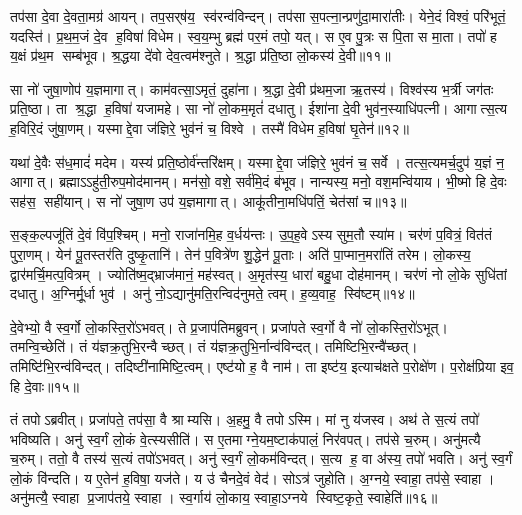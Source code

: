    तप॑सा दे॒वा दे॒वता॒मग्र॑ आयन्।
   तप॒सर्‌ष॑य॒ स्व॑रन्व॑विन्दन्।
   तप॑सा स॒पत्ना॒न्प्रणु॑दा॒मारा॑तीः।
   येने॒दं विश्वं॒ परि॑भूतं॒ यदस्ति॑।
   प्र॒थ॒म॒जं दे॒व ह॒विषा॑ विधेम।
   स्व॒य॒म्भु ब्रह्म॑ पर॒मं तपो॒ यत्।
   स ए॒व पु॒त्रः स पि॒ता स मा॒ता।
   तपो॑ ह य॒क्षं प्र॑थ॒म सम्ब॑भूव।
   श्र॒द्धया दे॑वो देव॒त्वम॑श्नुते।
   श्र॒द्धा प्र॑ति॒ष्ठा लो॒कस्य॑ दे॒वी॥११॥

   सा नो॑ जुषा॒णोप॑ य॒ज्ञमागात्।
   काम॑वत्सा॒ऽमृतं॒ दुहा॑ना।
   श्र॒द्धा दे॒वी प्र॑थम॒जा ऋ॒तस्य॑।
   विश्व॑स्य भ॒र्त्री जग॑तः प्रति॒ष्ठा।
   ता श्र॒द्धा ह॒विषा॑ यजामहे।
   सा नो॑ लो॒कम॒मृतं॑ दधातु।
   ईशा॑ना दे॒वी भुव॑न॒स्याधि॑पत्नी।
   आगात्स॒त्य ह॒विरि॒दं जु॑षा॒णम्।
   यस्माद्दे॒वा ज॑ज्ञिरे॒ भुव॑नं च॒ विश्वे।
   तस्मै॑ विधेम ह॒विषा॑ घृ॒तेन॑॥१२॥

   यथा॑ दे॒वैः स॑ध॒मादं॑ मदेम।
   यस्य॑ प्रति॒ष्ठोर्व॑न्तरि॑क्षम्।
   यस्माद्दे॒वा ज॑ज्ञिरे॒ भुव॑नं च॒ सर्वे।
   तत्स॒त्यमर्च॒दुप॑ य॒ज्ञं न॒ आगात्।
   ब्रह्माऽऽहु॑ती॒रुप॒मोद॑मानम्।
   मन॑सो॒ वशे॒ सर्व॑मि॒दं ब॑भूव।
   नान्यस्य॒ मनो॒ वश॒मन्वि॑याय।
   भी॒ष्मो हि दे॒वः सह॑स॒ सही॑यान्।
   स नो॑ जुषा॒ण उप॑ य॒ज्ञमागात्।
   आकू॑तीना॒मधि॑पतिं॒ चेत॑सां च॥१३॥

   स॒ङ्क॒ल्पजू॑तिं दे॒वं वि॑प॒श्चिम्।
   मनो॒ राजा॑नमि॒ह व॒र्धय॑न्तः।
   उ॒प॒ह॒वेऽस्य सुम॒तौ स्या॑म।
   चर॑णं प॒वित्रं॒ वित॑तं पुरा॒णम्।
   येन॑ पू॒तस्तर॑ति दुष्कृ॒तानि॑।
   तेन॑ प॒वित्रे॑ण शु॒द्धेन॑ पू॒ताः।
   अति॑ पा॒प्मान॒मरा॑तिं तरेम।
   लो॒कस्य॒ द्वार॑मर्चि॒मत्प॒वित्रम्।
   ज्योति॑ष्म॒द्भ्राज॑मानं॒ मह॑स्वत्।
   अ॒मृत॑स्य॒ धारा॑ बहु॒धा दोह॑मानम्।
   चर॑णं नो लो॒के सुधि॑तां दधातु।
   अ॒ग्निर्मू॒र्धा भुव॑।
   अनु॑ नो॒ऽद्यानु॑मति॒रन्विद॑नुमते॒ त्वम्।
   ह॒व्य॒वाह॒ स्वि॑ष्टम्॥१४॥
\anuvakamend
  
   दे॒वेभ्यो॒ वै स्व॒र्गो लो॒कस्ति॒रो॑ऽभवत्।
   ते प्र॒जाप॑तिमब्रुवन्।
   प्रजा॑पते स्व॒र्गो वै नो॑ लो॒कस्ति॒रो॑ऽभूत्।
   तमन्वि॒च्छेति॑।
   तं य॑ज्ञक्र॒तुभि॒रन्वैच्छत्।
   तं य॑ज्ञक्र॒तुभि॒र्नान्व॑विन्दत्।
   तमिष्टिभि॒\-रन्वै॑च्छत्।
   तमिष्टि॑भि॒रन्व॑विन्दत्।
   तदिष्टी॑नामिष्टि॒त्वम्।
   एष्ट॑यो ह॒ वै नाम॑।
   ता इष्ट॑य॒ इत्याच॑क्षते प॒रोक्षे॑ण।
   प॒रोक्ष॑प्रिया इव॒ हि दे॒वाः॥१५॥

   तं तपोऽब्रवीत्।
   प्रजा॑पते॒ तप॑सा॒ वै श्राम्यसि।
   अ॒हमु॒ वै तपोऽस्मि।
   मां नु य॑जस्व।
   अथ॑ ते स॒त्यं तपो॑ भविष्यति।
   अनु॑ स्व॒र्गं लो॒कं वे॒त्स्यसीति॑।
   स ए॒तमाग्ने॒यम॒ष्टाक॑पालं॒ निर॑वपत्।
   तप॑से च॒रुम्।
   अनु॑मत्यै च॒रुम्।
   ततो॒ वै तस्य॑ स॒त्यं तपो॑ऽभवत्।
   अनु॑ स्व॒र्गं लो॒कम॑विन्दत्।
   स॒त्य ह॒ वा अ॑स्य॒ तपो॑ भवति।
   अनु॑ स्व॒र्गं लो॒कं वि॑न्दति।
   य ए॒तेन॑ ह॒विषा॒ यज॑ते।
   य उ॑ चैनदे॒वं वेद॑।
   सोऽत्र॑ जुहोति।
   अ॒ग्नये॒ स्वाहा॒ तप॑से॒ स्वाहा।
   अनु॑मत्यै॒ स्वाहा प्र॒जाप॑तये॒ स्वाहा।
   स्व॒र्गाय॑ लो॒काय॒ स्वाहा॒ऽग्नये स्विष्ट॒कृते॒ स्वाहेति॑॥१६॥

